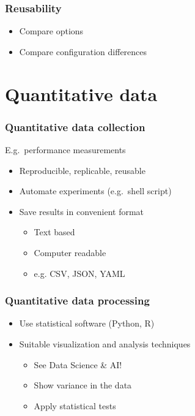 \documentclass[aspectratio=169]{beamer}
\begin{document}
\begin{frame}
  \frametitle{Reusability}


  \bigskip

  \begin{itemize}
    \item Compare options
    \item Compare configuration differences
  \end{itemize}

\end{frame}

\section{Quantitative data}

\begin{frame}
  \frametitle{Quantitative data collection}

  E.g.\ performance measurements

  \begin{itemize}
    \item Reproducible, replicable, reusable
    \item Automate experiments (e.g.\ shell script)
    \item Save results in convenient format
          \begin{itemize}
            \item Text based
            \item Computer readable
            \item e.g. CSV, JSON, YAML
          \end{itemize}
  \end{itemize}

\end{frame}

\begin{frame}
  \frametitle{Quantitative data processing}

  \begin{itemize}
    \item Use statistical software (Python, R)
    \item Suitable visualization and analysis techniques
          \begin{itemize}
            \item See Data Science \& AI!
            \item Show variance in the data
            \item Apply statistical tests
          \end{itemize}
  \end{itemize}

\end{frame}
\end{document}

